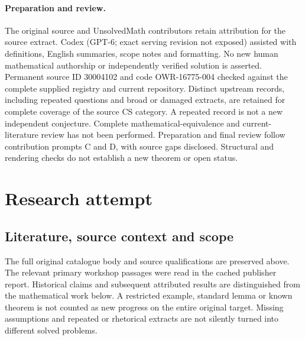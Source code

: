\documentclass[11pt]{article}
\begin{document}
\paragraph{Preparation and review.}
The original source and UnsolvedMath contributors retain attribution for the source extract. Codex (GPT-6; exact serving revision not exposed) assisted with definitions, English summaries, scope notes and formatting. No new human mathematical authorship or independently verified solution is asserted. Permanent source ID 30004102 and code OWR-16775-004 checked against the complete supplied registry and current repository. Distinct upstream records, including repeated questions and broad or damaged extracts, are retained for complete coverage of the source CS category. A repeated record is not a new independent conjecture. Complete mathematical-equivalence and current-literature review has not been performed. Preparation and final review follow contribution prompts C and D, with source gaps disclosed. Structural and rendering checks do not establish a new theorem or open status.
\label{end:30004102}

\section{Research attempt}
\subsection{Literature, source context and scope}
The full original catalogue body and source qualifications are preserved above. The relevant primary workshop passages were read in the cached publisher report. Historical claims and subsequent attributed results are distinguished from the mathematical work below. A restricted example, standard lemma or known theorem is not counted as new progress on the entire original target. Missing assumptions and repeated or rhetorical extracts are not silently turned into different solved problems.
\end{document}
